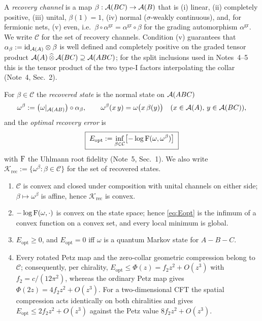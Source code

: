 \documentclass[11pt]{article}
\newcommand{\Erec}{E_{\mathrm{opt}}}
\newcommand{\Krec}{\mathcal K_{\mathrm{rec}}}
\begin{document}
\begin{definition}\label{def:admissible}
A \emph{recovery channel} is a map \(\beta:\mathcal A(BC)\to\mathcal A(B)\) that is
(i) linear, (ii) completely positive, (iii) unital, \(\beta(1)=1\),
(iv) normal (\(\sigma\)-weakly continuous), and, for fermionic nets,
(v) even, i.e.\ \(\beta\circ\alpha^{\mathrm{gr}}=\alpha^{\mathrm{gr}}\circ\beta\)
for the grading automorphism \(\alpha^{\mathrm{gr}}\).  We write \(\mathcal C\)
for the set of recovery channels.  Condition (v) guarantees that
\(\alpha_\beta:=\mathrm{id}_{\mathcal A(A)}\otimes\beta\) is well defined and
completely positive on the graded tensor product
\(\mathcal A(A)\,\widehat\otimes\,\mathcal A(BC)\supseteq\mathcal A(ABC)\); for the split inclusions
used in Notes~4--5 this is the tensor product of the two type-I factors
interpolating the collar (Note~4, Sec.~2).
\end{definition}

\begin{definition}\label{def:Eopt}
For \(\beta\in\mathcal C\) the \emph{recovered state} is the normal state on
\(\mathcal A(ABC)\)
\begin{equation}\label{eq:rec-state}
 \omega^\beta:=\bigl(\omega|_{\mathcal A(AB)}\bigr)\circ\alpha_\beta,\qquad
 \omega^\beta(x\,y)=\omega\bigl(x\,\beta(y)\bigr)\quad(x\in\mathcal A(A),\,y\in\mathcal A(BC)),
\end{equation}
and the \emph{optimal recovery error} is
\begin{equation}\label{eq:Eopt}
 \boxed{\;\Erec:=\inf_{\beta\in\mathcal C}\bigl[-\log\Fid(\omega,\omega^\beta)\bigr]\;}
\end{equation}
with \(\operatorname{F}\) the Uhlmann root fidelity (Note~5, Sec.~1).  We also write
\(\Krec:=\{\omega^\beta:\beta\in\mathcal C\}\) for the set of recovered states.
\end{definition}

\begin{proposition}\label{prop:convex}
\begin{enumerate}[leftmargin=1.6em,itemsep=1pt]
\item \(\mathcal C\) is convex and closed under composition with unital channels
 on either side; \(\beta\mapsto\omega^\beta\) is affine, hence \(\Krec\) is convex.
\item \(-\log\operatorname{F}(\omega,\cdot)\) is convex on the state space; hence
 \eqref{eq:Eopt} is the infimum of a convex function on a convex set, and every
 local minimum is global.
\item \(\Erec\ge0\), and \(\Erec=0\) iff \(\omega\) is a quantum Markov state for
 \(A\!-\!B\!-\!C\).
\item Every rotated Petz map and the zero-collar geometric compression belong to
 \(\mathcal C\); consequently, per chirality,
 \(\Erec\le\Phi(z)=f_2z^2+O(z^3)\) with \(f_2=c/(12\pi^2)\), whereas the ordinary
 Petz map gives \(\Phi(2z)=4f_2z^2+O(z^3)\).  For a two-dimensional CFT the
 spatial compression acts identically on both chiralities and gives
 \(\Erec\le2f_2z^2+O(z^3)\) against the Petz value \(8f_2z^2+O(z^3)\).
\end{enumerate}
\end{proposition}
\end{document}
